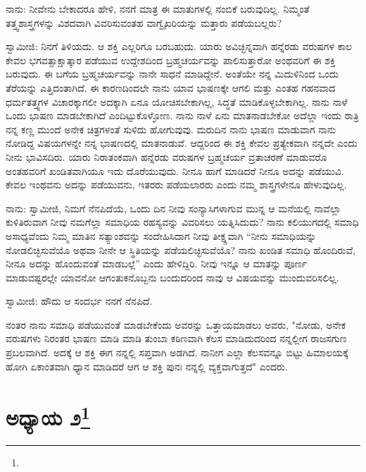 ನಾನು: ನೀವೇನು ಬೇಕಾದರೂ ಹೇಳಿ, ನನಗೆ ಮಾತ್ರ ಈ ಮಾತುಗಳಲ್ಲಿ ನಂಬಿಕೆ ಬರುವುದಿಲ್ಲ. ನಿಮ್ಮಂತೆ ತತ್ತ್ವಶಾಸ್ತ್ರಗಳನ್ನು ವಿಶದವಾಗಿ ವಿವರಿಸುವಂತಹ ವಾಗ್ವೈಖರಿಯನ್ನು ಮತ್ತಾರು ಪಡೆಯಬಲ್ಲರು?

ಸ್ವಾಮೀಜಿ: ನಿನಗೆ ತಿಳಿಯದು. ಆ ಶಕ್ತಿ ಎಲ್ಲರಿಗೂ ಬರಬಹುದು. ಯಾರು ಅವಿಚ್ಛಿನ್ನವಾಗಿ ಹನ್ನೆರಡು ವರುಷಗಳ ಕಾಲ ಕೇವಲ ಭಗವತ್ಸಾಕ್ಷಾತ್ಕಾರ ಪಡೆಯುವ ಉದ್ದೇಶದಿಂದ ಬ್ರಹ್ಮಚರ್ಯವನ್ನು ಪಾಲಿಸುತ್ತಾರೋ ಅಂಥವರಿಗೆ ಈ ಶಕ್ತಿ ಬರುವುದು. ಈ ಬಗೆಯ ಬ್ರಹ್ಮಚರ್ಯವನ್ನು ನಾನೇ ಸಾಧನೆ ಮಾಡಿದ್ದೇನೆ. ಅಂತೆಯೇ ನನ್ನ ಮಿದುಳಿನಿಂದ ಒಂದು ತೆರೆಯನ್ನು ಎತ್ತಿದಂತಾಗಿದೆ. ಈ ಕಾರಣದಿಂದಲೇ ನಾನು ಯಾವ ಭಾಷಣಕ್ಕೇ ಆಗಲಿ ಮತ್ತು ಎಂತಹ ಗಹನವಾದ ಧರ್ಮತತ್ತ್ವಗಳ ವಿಚಾರಕ್ಕಾಗಲೀ ಅದಕ್ಕಾಗಿ ಏನೂ ಯೋಚಿಸಬೇಕಾಗಿಲ್ಲ, ಸಿದ್ಧತೆ ಮಾಡಿಕೊಳ್ಳಬೇಕಾಗಿಲ್ಲ. ನಾನು ನಾಳೆ ಒಂದು ಭಾಷಣ ಮಾಡಬೇಕಾಗಿದೆ ಎಂದಿಟ್ಟುಕೊಳ್ಳೋಣ. ನಾನು ನಾಳೆ ಏನು ಮಾತನಾಡಬೇಕೋ ಅದೆಲ್ಲಾ ಇಂದು ರಾತ್ರಿ ನನ್ನ ಕಣ್ಣ ಮುಂದೆ ಅನೇಕ ಚಿತ್ರಗಳಂತೆ ಸುಳಿದು ಹೋಗುವುವು. ಮರುದಿನ ನಾನು ಭಾಷಣ ಮಾಡುವಾಗ ನಾನು ನೋಡಿದ್ದ ವಿಷಯಗಳನ್ನೇ ನನ್ನ ಭಾಷಣದಲ್ಲಿ ಮಾತನಾಡುವೆ. ಆದ್ದರಿಂದ ಈ ಶಕ್ತಿ ಕೇವಲ ಪ್ರತ್ಯೇಕವಾಗಿ ನನ್ನದೇ ಎಂದು ನೀನು ಭಾವಿಸದಿರು. ಯಾರು ನಿರಾತಂಕವಾಗಿ ಹನ್ನೆರಡು ವರುಷಗಳ ಬ್ರಹ್ಮಚರ್ಯ ವ್ರತಾಚರಣೆ ಮಾಡುವರೊ ಅಂತಹವರಿಗೆ ಖಂಡಿತವಾಗಿಯೂ ಇದು ದೊರೆಯುವುದು. ನೀನೂ ಹಾಗೆ ಮಾಡಿದರೆ ನೀನೂ ಅದನ್ನು ಪಡೆಯುವಿ. ಕೇವಲ ಇಂಥವನು ಅದನ್ನು ಪಡೆಯುವನು, ಇತರರು ಪಡೆಯಲಾರರು ಎಂದು ನಮ್ಮ ಶಾಸ್ತ್ರಗಳೇನೂ ಹೇಳುವುದಿಲ್ಲ.

ನಾನು: ಸ್ವಾಮೀಜಿ, ನಿಮಗೆ ನೆನಪಿದೆಯೆ, ಒಂದು ದಿನ ನೀವು ಸಂನ್ಯಾಸಿಗಳಾಗುವ ಮುನ್ನ ಆ ಮನೆಯಲ್ಲಿ ನಾವೆಲ್ಲಾ ಕುಳಿತಿರುವಾಗ ನೀವು ನಮಗೆಲ್ಲಾ ಸಮಾಧಿಯ ರಹಸ್ಯವನ್ನು ವಿವರಿಸಲು ಯತ್ನಿಸಿದುದು? ನಾನು ಕಲಿಯುಗದಲ್ಲಿ ಸಮಾಧಿ ಅಸಾಧ್ಯವೆಂದು ನಿಮ್ಮ ಮಾತಿನ ಸತ್ಯಾಂಶವನ್ನು ಸಂದೇಹಿಸಿದಾಗ ನೀವು ತೀಕ್ಷ್ಣವಾಗಿ “ನೀನು ಸಮಾಧಿಯನ್ನು ನೋಡಲಿಚ್ಛಿಸುವೆಯೊ ಅಥವಾ ನೀನೇ ಆ ಸ್ಥಿತಿಯನ್ನು ಪಡೆಯಲಿಚ್ಛಿಸುವೆಯೊ? ನಾನು ಖಂಡಿತ ಸಮಾಧಿ ಹೊಂದಿರುವೆ, ನೀನೂ ಅದನ್ನು ಹೊಂದುವಂತೆ ಮಾಡಬಲ್ಲೆ” ಎಂದು ಹೇಳಿದ್ದಿರಿ. ನೀವು ಇನ್ನೂ ಆ ಮಾತನ್ನು ಪೂರ್ಣ ಮಾಡುವಷ್ಟರಲ್ಲೇ ಯಾವನೋ ಆಗಂತುಕನೊಬ್ಬನು ಬಂದುದರಿಂದ ನಾವು ಆ ವಿಷಯವನ್ನು ಮುಂದುವರಿಸಲಿಲ್ಲ.

ಸ್ವಾಮೀಜಿ: ಹೌದು ಆ ಸಂದರ್ಭ ನನಗೆ ನೆನಪಿದೆ.

ನಂತರ ನಾನು ಸಮಾಧಿ ಪಡೆಯುವಂತೆ ಮಾಡಬೇಕೆಂದು ಅವರನ್ನು ಒತ್ತಾಯಮಾಡಲು ಅವರು, "ನೋಡು, ಅನೇಕ ವರುಷಗಳು ನಿರಂತರ ಭಾಷಣ ಮಾಡಿ ಮಾಡಿ ತುಂಬಾ ಕಠಿಣವಾಗಿ ಕೆಲಸ ಮಾಡಿದುದರಿಂದ ನನ್ನಲ್ಲೀಗ ರಾಜಸಗುಣ ಪ್ರಬಲವಾಗಿದೆ. ಅದಕ್ಕೆ ಆ ಶಕ್ತಿ ಈಗ ನನ್ನಲ್ಲಿ ಸಪ್ತವಾಗಿ ಅಡಗಿದೆ. ನಾನೀಗ ಎಲ್ಲಾ ಕೆಲಸವನ್ನೂ ಬಿಟ್ಟು ಹಿಮಾಲಯಕ್ಕೆ ಹೋಗಿ ಏಕಾಂತವಾಗಿ ಧ್ಯಾನ ಮಾಡಿದರೆ ಆಗ ಆ ಶಕ್ತಿ ಪುನಃ ನನ್ನಲ್ಲಿ ವ್ಯಕ್ತವಾಗುತ್ತದೆ" ಎಂದರು.

\chapter{ಅಧ್ಯಾಯ ೨\protect\footnote{}}

